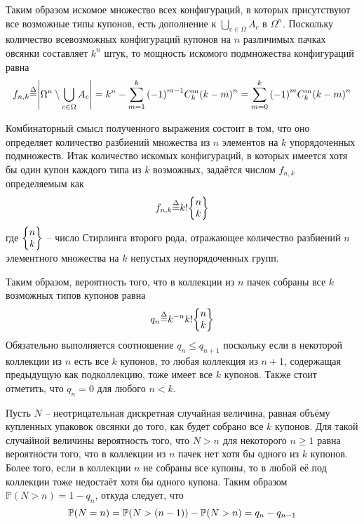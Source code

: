 \documentclass[a4paper]{article}
\let\originalleft\left
\let\originalright\right
\renewcommand{\left}{\mathopen{}\mathclose\bgroup\originalleft}
\renewcommand{\right}{\aftergroup\egroup\originalright}
\newcommand{\obj}[1]{{\left\{ #1 \right \}}}
\newcommand{\brac}[1]{{\left ( #1 \right )}}
\newcommand{\abs}[1]{{\left | #1 \right |}}
\newcommand{\pr}[0]{{\mathbb{P}}}
\newcommand{\defn}{{\mathop{\overset{\Delta}{=}}\nolimits}}
\begin{document}
Таким образом искомое множество всех конфигураций, в которых
присутствуют все возможные типы купонов, есть дополнение к
$\bigcup_{c\in \Omega}A_c$ в $\Omega^n$.
Поскольку количество всевозможных конфигураций купонов на $n$
различимых пачках овсянки составляет $k^n$ штук, то мощность
искомого подмножества конфигураций равна
\[f_{n,k} \defn \abs{\Omega^n\setminus \bigcup_{c\in \Omega}A_c }
= k^n - \sum_{m=1}^k \brac{-1}^{m-1} C^m_k \brac{k - m}^n
= \sum_{m=0}^k \brac{-1}^m C^m_k \brac{k - m}^n \]

Комбинаторный смысл полученного выражения состоит в том, что
оно определяет количество разбиений множества из $n$ элементов на $k$
упорядоченных подмножеств.
Итак количество искомых конфигураций, в которых имеется хотя бы один
купон каждого типа из $k$ возможных, задаётся числом $f_{n,k}$
определяемым как
\[f_{n,k} \defn  k! \obj{\begin{matrix} n \\ k \end{matrix}}\]
где $\obj{\begin{matrix} n \\ k \end{matrix}}$
-- число Стирлинга второго рода, отражающее количество разбиений $n$
элементного множества на $k$ непустых неупорядоченных групп.

Таким образом, вероятность того, что в коллекции из $n$ пачек собраны все $k$ возможных типов купонов равна
\[q_n \defn k^{-n} k! \obj{\begin{matrix} n \\ k \end{matrix}}\]
Обязательно выполняется соотношение $q_n\leq q_{n+1}$ поскольку если
в некоторой коллекции из $n$ есть все $k$ купонов, то любая
коллекция из $n+1$, содержащая предыдущую как подколлекцию, тоже
имеет все $k$ купонов.
Также стоит отметить, что $q_n = 0$ для любого $n<k$.

Пусть $N$ -- неотрицательная дискретная случайная величина, равная
объёму купленных упаковок овсянки до того, как будет собрано все $k$
купонов.
Для такой случайной величины вероятность того, что $N>n$ для
некоторого $n\geq1$ равна вероятности того, что в коллекции из $n$
пачек нет хотя бы одного из $k$ купонов.
Более того, если в коллекции $n$ не собраны все купоны, то в любой
её под коллекции тоже недостаёт хотя бы одного купона.
Таким образом $\pr(N>n) = 1-q_n$, откуда следует, что
\[\pr(N=n) = \pr\brac{N>(n-1)} - \pr(N>n) = q_n - q_{n-1} \]
\end{document}
